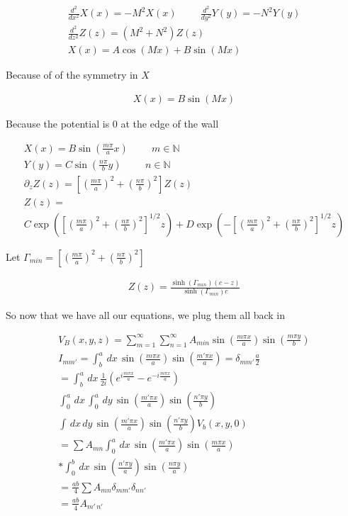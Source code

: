 \documentclass[fleqn]{report}
\newcommand{\hp}{\hspace{1cm}}
\newcommand{\del}{\partial}
\newcommand{\equations} [1] {
\begin{gather*}
#1
\end{gather*}
}
\begin{document}
\equations{
    \frac{d^2}{dx^2} X(x) = - M^2 X(x)
    \hp
    \frac{d^2}{dy^2} Y(y) = - N^2 Y(y)
    \\
    \frac{d^2}{dz^2} Z(z) = (M^2 + N^2) Z(z)
    \\
    X(x) 
    =
    A \cos(Mx) + B \sin(Mx)
}
Because of of the symmetry in $X$ 
\equations{
    X(x) 
    =
    B \sin(Mx)
}
Because the potential is 0 at the edge of the wall 
\equations{
    X(x) 
    =
    B \sin(\frac{m \pi}{a} x) \hp m \in \mathbb N
    \\
    Y(y) 
    =
    C \sin(\frac{n \pi}{b} y) \hp n \in \mathbb N
    \\
    \del_z Z(z)
    =
    \left[
        (\frac{m \pi}{a})^2 + 
        (\frac{n \pi}{b})^2
    \right] 
    Z(z)
    \\
    Z(z)
    =
    \\
    C \exp(
    \left[
        (\frac{m \pi}{a})^2 + 
        (\frac{n \pi}{b})^2
    \right]^{1/2} 
    z
    )
    +
    D \exp(
        -
    \left[
        (\frac{m \pi}{a})^2 + 
        (\frac{n \pi}{b})^2
    \right]^{1/2}
    z
    )
}
Let 
$
    \Gamma_{min} 
    =
    \left[
        (\frac{m \pi}{a})^2 + 
        (\frac{n \pi}{b})^2
    \right]
$
\equations{
    Z(z)
    =
    \frac{\sinh(\Gamma_{min})(c - z)}{\sinh(\Gamma_{min}) c}
}
So now that we have all our equations, we plug them all back in 
\equations{
    V_B(x, y, z)
    =
    \sum^{\infty}_{m = 1}
    \sum^{\infty}_{n = 1}
    A_{min}
    \sin(\frac{m \pi x}{a})
    \sin(\frac{m \pi y}{b})
    \\
    I_{m m'}
    =
    \int^a_b \, dx \,
    \sin(\frac{m \pi x}{a})
    \sin(\frac{m' \pi x}{a})
    =
    \delta_{m m'} \frac{a}{2}
    \\
    =
    \int^a_b \, dx \,
    \frac{1}{2 i}
    \left(
        e^{i \frac{m \pi x}{a}}
        -
        e^{-i \frac{m \pi x}{a}}
    \right)
    \\
    \int^a_0 \, dx \,
    \int^a_0 \, dy \,
    \sin(\frac{m' \pi x}{a})
    \sin(\frac{n' \pi y}{b})
    \\
    \int \, dx \, dy \,
    \sin(\frac{m' \pi x}{a})
    \sin(\frac{n' \pi y}{b})
    V_b(x, y, 0)
    \\
    =
    \sum A_{mn}
    \int^a_0 \, dx \,
    \sin(\frac{m' \pi x}{a})
    \sin(\frac{m \pi x}{a}) \\ *
    \int^b_0 \, dx \,
    \sin(\frac{n' \pi y}{a})
    \sin(\frac{n \pi y}{a})
    \\
    = 
    \frac{ab}{4}
    \sum A_{mn}
    \delta_{mm'}
    \delta_{nn'}
    \\
    =
    \frac{ab}{4} A_{m' \, n'}
}
\end{document}
